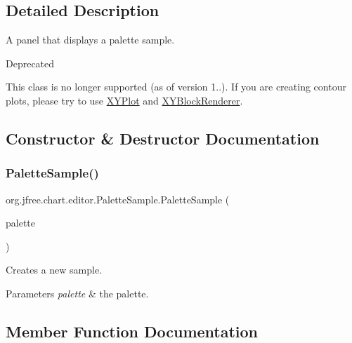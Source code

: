 \subsection{Detailed Description}
A panel that displays a palette sample.

\begin{DoxyRefDesc}{Deprecated}
\item[\mbox{\hyperlink{deprecated__deprecated000036}{Deprecated}}]This class is no longer supported (as of version 1..). If you are creating contour plots, please try to use \mbox{\hyperlink{}{X\+Y\+Plot}} and \mbox{\hyperlink{}{X\+Y\+Block\+Renderer}}. \end{DoxyRefDesc}


\subsection{Constructor \& Destructor Documentation}
\mbox{\label{classorg_1_1jfree_1_1chart_1_1editor_1_1_palette_sample_a6ea5f8347a3519fdfc19c9f5ebce4019}} 
\subsubsection{\texorpdfstring{Palette\+Sample()}{PaletteSample()}}
{\footnotesize\ttfamily org.\+jfree.\+chart.\+editor.\+Palette\+Sample.\+Palette\+Sample (\begin{DoxyParamCaption}\item[{\mbox{\hyperlink{classorg_1_1jfree_1_1chart_1_1plot_1_1_color_palette}{Color\+Palette}}}]{palette }\end{DoxyParamCaption})}

Creates a new sample.


\begin{DoxyParams}{Parameters}
{\em palette} & the palette. \\
\hline
\end{DoxyParams}


\subsection{Member Function Documentation}
\mbox{\label{classorg_1_1jfree_1_1chart_1_1editor_1_1_palette_sample_a8218550f912f608ba7f0b2add8472070}} 
